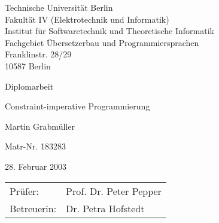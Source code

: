 
\def\germantoday{\number\day. \ifcase\month\or
  Januar\or Februar\or M\"arz\or April\or Mai\or Juni\or
  Juli\or August\or September\or Oktober\or November\or Dezember\fi
  \space\number\year}

\thispagestyle{empty}

\noindent
Technische Universit\"at Berlin\\
Fakult\"at IV (Elektrotechnik und Informatik)\\
Institut f\"ur Softwaretechnik und Theoretische Informatik\\
Fachgebiet \"Ubersetzerbau und Programmiersprachen\\
Franklinstr. 28/29\\
10587 Berlin

\vskip3cm

\begin{center}
{\Large 


\vskip1cm

Diplomarbeit

\vskip1cm

{\huge \sf Constraint-imperative Programmierung}

\vskip1cm

Martin Grabm\"uller


Matr-Nr. 183283

\vskip0.5cm

28. Februar 2003

\vskip2cm

\begin{tabular}{ll}
Pr\"ufer: &Prof. Dr. Peter Pepper\\
Betreuerin: &Dr. Petra Hofstedt
\end{tabular}
}

\end{center}

\cleardoublepage

{}



